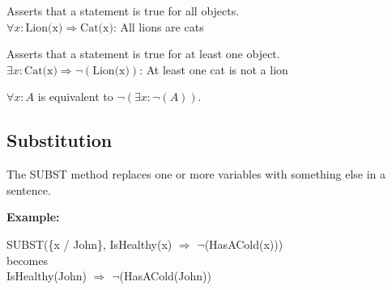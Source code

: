 \documentclass[
../../EiKI_Summary.tex,
]
{subfiles}
\begin{document}
\begin{minipage}
    [t]{0.5\textwidth}
    \begin{defbox}
        Asserts that a statement is true for all objects.\\
        $\forall x: \text{Lion(x)} \Rightarrow \text{Cat(x)}$: All lions are cats
    \end{defbox}
\end{minipage}
\begin{minipage}
    [t]{0.5\textwidth}
    \begin{defbox}
        Asserts that a statement is true for at least one object.\\
        $\exists x: \text{Cat(x)} \Rightarrow \neg(\text{Lion(x)})$: At least one cat is not a lion
    \end{defbox}
\end{minipage}

$\forall x: A$ is equivalent to $\neg(\exists x: \neg(A))$.

\newpage
\subsection{Substitution}
\begin{defbox}
    The SUBST method replaces one or more variables with something else in a sentence.
\end{defbox}

\textbf{Example:}\\

\begin{center}
	SUBST(\{x / John\}, IsHealthy(x) $\Rightarrow$ $\neg$(HasACold(x)))\\
    becomes\\
    IsHealthy(John) $\Rightarrow$ $\neg$(HasACold(John))
\end{center}
\end{document}
